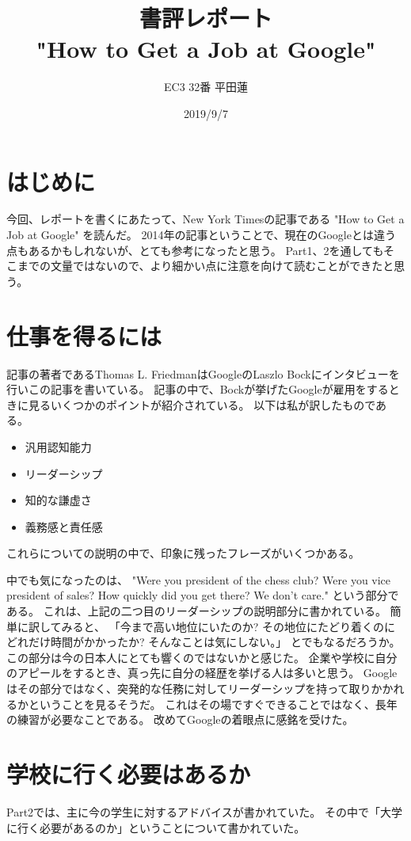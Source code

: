 \documentclass{jsarticle}
\title{書評レポート\\"How to Get a Job at Google"}
\author{EC3 32番 平田蓮}
\date{2019/9/7}
\begin{document}
\maketitle
\section{はじめに}
    今回、レポートを書くにあたって、New York Timesの記事である "How to Get a Job at Google" を読んだ。
    2014年の記事ということで、現在のGoogleとは違う点もあるかもしれないが、とても参考になったと思う。
    Part1、2を通してもそこまでの文量ではないので、より細かい点に注意を向けて読むことができたと思う。
\section{仕事を得るには}
    記事の著者であるThomas L. FriedmanはGoogleのLaszlo Bockにインタビューを行いこの記事を書いている。
    記事の中で、Bockが挙げたGoogleが雇用をするときに見るいくつかのポイントが紹介されている。
    以下は私が訳したものである。
    \begin{itemize}
        \item 汎用認知能力
        \item リーダーシップ
        \item 知的な謙虚さ
        \item 義務感と責任感
    \end{itemize}
    これらについての説明の中で、印象に残ったフレーズがいくつかある。

    中でも気になったのは、
    "Were you president of the chess club? Were you vice president of sales? How quickly did you get there? We don't care."
    という部分である。
    これは、上記の二つ目のリーダーシップの説明部分に書かれている。
    簡単に訳してみると、
    「今まで高い地位にいたのか? その地位にたどり着くのにどれだけ時間がかかったか? そんなことは気にしない。」
    とでもなるだろうか。
    この部分は今の日本人にとても響くのではないかと感じた。
    企業や学校に自分のアピールをするとき、真っ先に自分の経歴を挙げる人は多いと思う。
    Googleはその部分ではなく、突発的な任務に対してリーダーシップを持って取りかかれるかということを見るそうだ。
    これはその場ですぐできることではなく、長年の練習が必要なことである。
    改めてGoogleの着眼点に感銘を受けた。

\section{学校に行く必要はあるか}
    Part2では、主に今の学生に対するアドバイスが書かれていた。
    その中で「大学に行く必要があるのか」ということについて書かれていた。
\end{document}
